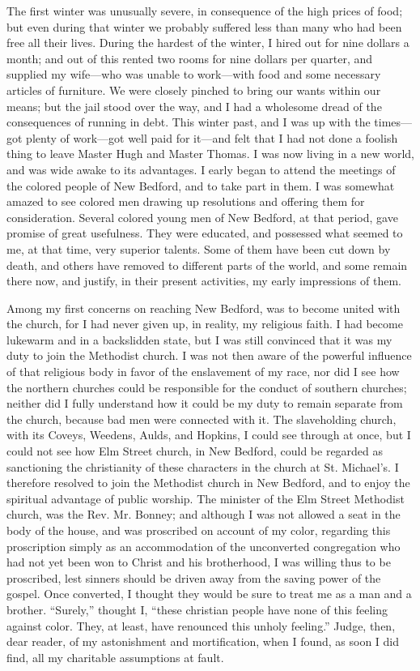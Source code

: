 The first winter was unusually severe, in consequence of the high prices
of food; but even during that winter we probably suffered less than many
who had been free all their lives. During the hardest of the winter, I
hired out for nine dollars a month; and out of this rented two rooms for
nine dollars per quarter, and supplied my wife---who was unable to
work---with food and some necessary articles of furniture. We were
closely pinched to bring our wants within our means; but the jail stood
over the way, and I had a wholesome dread of the consequences of running
in debt. This winter past, and I was up with the times---got plenty of
work---got well paid for it---and felt that I had not done a foolish
thing to leave Master Hugh and Master Thomas. I was now living in a new
world, and was wide awake to its advantages. I early began to attend the
meetings of the colored people of New Bedford, and to take part in them.
I was somewhat amazed to see colored men drawing up resolutions and
offering them for consideration. Several colored young men of New
Bedford, at that period, gave promise of great usefulness. They were
educated, and possessed what seemed to me, at that time, very superior
talents. Some of them have been cut down by death, and others have
removed to different parts of the world, and some remain there now, and
justify, in their present activities, my early impressions of them.

Among my first concerns on reaching New Bedford, was to become united
with the church, for I had {\protect\hypertarget{351}{}{}}never given
up, in reality, my religious faith. I had become lukewarm and in a
backslidden state, but I was still convinced that it was my duty to join
the Methodist church. I was not then aware of the powerful influence of
that religious body in favor of the enslavement of my race, nor did I
see how the northern churches could be responsible for the conduct of
southern churches; neither did I fully understand how it could be my
duty to remain separate from the church, because bad men were connected
with it. The slaveholding church, with its Coveys, Weedens, Aulds, and
Hopkins, I could see through at once, but I could not see how Elm Street
church, in New Bedford, could be regarded as sanctioning the
christianity of these characters in the church at St. Michael's. I
therefore resolved to join the Methodist church in New Bedford, and to
enjoy the spiritual advantage of public worship. The minister of the Elm
Street Methodist church, was the Rev. Mr. Bonney; and although I was not
allowed a seat in the body of the house, and was proscribed on account
of my color, regarding this proscription simply as an accommodation of
the unconverted congregation who had not yet been won to Christ and his
brotherhood, I was willing thus to be proscribed, lest sinners should be
driven away from the saving power of the gospel. Once converted, I
thought they would be sure to treat me as a man and a brother.
``Surely,'' thought I, ``these christian people have none of this
feeling against color. They, at least, have renounced this unholy
feeling.'' Judge, then, dear reader, of my astonishment and
mortification, when I found, as {\protect\hypertarget{352}{}{}}soon I
did find, all my charitable assumptions at fault.

